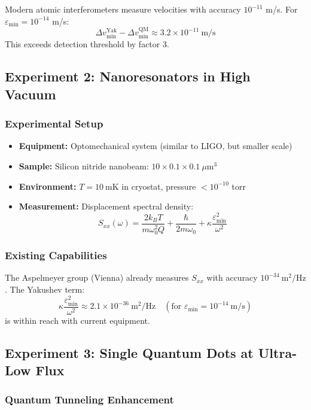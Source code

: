 \documentclass[11pt,a4paper]{article}
\begin{document}
	Modern atomic interferometers measure velocities with accuracy $10^{-11}$ m/s. For $\varepsilon_{\min} = 10^{-14}$ m/s:
	\[
	\Delta v_{\min}^{\text{Yak}} - \Delta v_{\min}^{\text{QM}} \approx 3.2 \times 10^{-11}\ \text{m/s}
	\]
	This exceeds detection threshold by factor 3.
	
	\subsection{Experiment 2: Nanoresonators in High Vacuum}
	
	\subsubsection{Experimental Setup}
	
	\begin{itemize}
		\item \textbf{Equipment:} Optomechanical system (similar to LIGO, but smaller scale)
		\item \textbf{Sample:} Silicon nitride nanobeam: $10 \times 0.1 \times 0.1\ \mu\text{m}^3$
		\item \textbf{Environment:} $T = 10\ \text{mK}$ in cryostat, pressure $< 10^{-10}$ torr
		\item \textbf{Measurement:} Displacement spectral density:
		\[
		S_{xx}(\omega) = \frac{2k_B T}{m\omega_0^2 Q} + \frac{\hbar}{2m\omega_0} + \kappa\frac{\varepsilon_{\min}^2}{\omega^2}
		\]
	\end{itemize}
	
	\subsubsection{Existing Capabilities}
	
	The Aspelmeyer group (Vienna) already measures $S_{xx}$ with accuracy $10^{-34}\ \text{m}^2/\text{Hz}$. The Yakushev term:
	\[
	\kappa\frac{\varepsilon_{\min}^2}{\omega^2} \approx 2.1 \times 10^{-36}\ \text{m}^2/\text{Hz} \quad (\text{for } \varepsilon_{\min} = 10^{-14}\ \text{m/s})
	\]
	is within reach with current equipment.
	
	\subsection{Experiment 3: Single Quantum Dots at Ultra-Low Flux}
	
	\subsubsection{Quantum Tunneling Enhancement}
	
\end{document}
